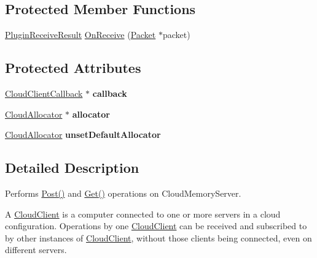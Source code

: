 \subsection*{Protected Member Functions}
\begin{DoxyCompactItemize}
\item 
\hyperlink{group___p_l_u_g_i_n___i_n_t_e_r_f_a_c_e___g_r_o_u_p_ga89998adaafb29e5d879113b992161085}{Plugin\-Receive\-Result} \hyperlink{class_rak_net_1_1_cloud_client_a17e6ca18a786db8612d6c64d82673bd1}{On\-Receive} (\hyperlink{struct_rak_net_1_1_packet}{Packet} $\ast$packet)
\end{DoxyCompactItemize}
\subsection*{Protected Attributes}
\begin{DoxyCompactItemize}
\item 
\hypertarget{class_rak_net_1_1_cloud_client_a5e921bb7c18db08aeedca8ad18d25554}{\hyperlink{class_rak_net_1_1_cloud_client_callback}{Cloud\-Client\-Callback} $\ast$ {\bfseries callback}}\label{class_rak_net_1_1_cloud_client_a5e921bb7c18db08aeedca8ad18d25554}

\item 
\hypertarget{class_rak_net_1_1_cloud_client_aaab12db5027a47176118d3a7f5513641}{\hyperlink{class_rak_net_1_1_cloud_allocator}{Cloud\-Allocator} $\ast$ {\bfseries allocator}}\label{class_rak_net_1_1_cloud_client_aaab12db5027a47176118d3a7f5513641}

\item 
\hypertarget{class_rak_net_1_1_cloud_client_abe27b394260a29053c749aed60496fd0}{\hyperlink{class_rak_net_1_1_cloud_allocator}{Cloud\-Allocator} {\bfseries unset\-Default\-Allocator}}\label{class_rak_net_1_1_cloud_client_abe27b394260a29053c749aed60496fd0}

\end{DoxyCompactItemize}


\subsection{Detailed Description}
Performs \hyperlink{class_rak_net_1_1_cloud_client_aa561b024fd2f02c7f19c1cc36cfd2382}{Post()} and \hyperlink{class_rak_net_1_1_cloud_client_a97bcdfb7e824f979efa7491d3c837204}{Get()} operations on Cloud\-Memory\-Server. 

A \hyperlink{class_rak_net_1_1_cloud_client}{Cloud\-Client} is a computer connected to one or more servers in a cloud configuration. Operations by one \hyperlink{class_rak_net_1_1_cloud_client}{Cloud\-Client} can be received and subscribed to by other instances of \hyperlink{class_rak_net_1_1_cloud_client}{Cloud\-Client}, without those clients being connected, even on different servers. 

